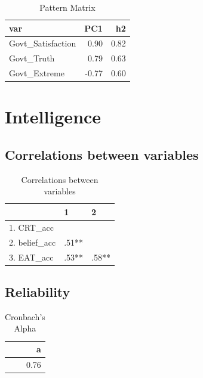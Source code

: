 \documentclass[]{article}
\begin{document}
\begin{table}[H]

\caption{\label{tab:unnamed-chunk-36}Pattern Matrix}
\centering
\fontsize{6}{8}\selectfont
\begin{tabular}[t]{lrr}
\toprule
var & PC1 & h2\\
\midrule
Govt\_Satisfaction & 0.90 & 0.82\\
Govt\_Truth & 0.79 & 0.63\\
Govt\_Extreme & -0.77 & 0.60\\
\bottomrule
\end{tabular}
\end{table}

\newpage

\hypertarget{intelligence}{%
\section{Intelligence}\label{intelligence}}

\hypertarget{correlations-between-variables-7}{%
\subsection{Correlations between
variables}\label{correlations-between-variables-7}}

\begin{table}[H]

\caption{\label{tab:unnamed-chunk-37}Correlations between variables}
\centering
\fontsize{6}{8}\selectfont
\begin{tabular}[t]{lll}
\toprule
  & 1 & 2\\
\midrule
1. CRT\_acc &  & \\
2. belief\_acc & .51** & \\
3. EAT\_acc & .53** & .58**\\
\bottomrule
\end{tabular}
\end{table}

\hypertarget{reliability-6}{%
\subsection{Reliability}\label{reliability-6}}

\begin{table}[H]

\caption{\label{tab:unnamed-chunk-38}Cronbach's Alpha}
\centering
\fontsize{6}{8}\selectfont
\begin{tabular}[t]{r}
\toprule
a\\
\midrule
0.76\\
\bottomrule
\end{tabular}
\end{table}
\end{document}
